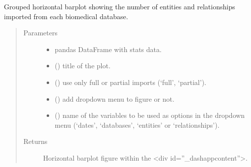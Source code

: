 \documentclass[letterpaper,10pt,english]{sphinxmanual}
\begin{document}
\begin{fulllineitems}
\label{\detokenize{_autosummary/report_manager.apps:report_manager.apps.imports.plot_databases_numbers_per_date}}
Grouped horizontal barplot showing the number of entities and relationships imported from each biomedical database.
\begin{quote}\begin{description}
\item[{Parameters}] \leavevmode\begin{itemize}
\item {} 
 \textendash{} pandas DataFrame with stats data.

\item {} 
 () \textendash{} title of the plot.

\item {} 
 () \textendash{} use only full or partial imports (‘full’, ‘partial’).

\item {} 
 () \textendash{} add dropdown menu to figure or not.

\item {} 
 () \textendash{} name of the variables to be used as options in the dropdown menu (‘dates’,                         ‘databases’, ‘entities’ or ‘relationships’).

\end{itemize}

\item[{Returns}] \leavevmode
Horizontal barplot figure within the \textless{}div id=”\_dash\sphinxhyphen{}app\sphinxhyphen{}content”\textgreater{}.

\end{description}\end{quote}

\end{fulllineitems}
\end{document}
